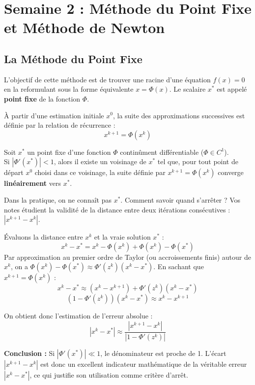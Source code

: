 \section{Semaine 2 : Méthode du Point Fixe et Méthode de Newton}

\subsection{La Méthode du Point Fixe}

L'objectif de cette méthode est de trouver une racine d'une équation $f(x) = 0$ en la reformulant sous la forme équivalente $x = \Phi(x)$. Le scalaire $x^*$ est appelé \textbf{point fixe} de la fonction $\Phi$.

\begin{definition}
À partir d'une estimation initiale $x^0$, la suite des approximations successives est définie par la relation de récurrence :
$$x^{k+1} = \Phi(x^k)$$
\end{definition}

\begin{theoreme}
Soit $x^*$ un point fixe d'une fonction $\Phi$ continûment différentiable ($\Phi \in C^1$). \\
Si $|\Phi'(x^*)| < 1$, alors il existe un voisinage de $x^*$ tel que, pour tout point de départ $x^0$ choisi dans ce voisinage, la suite définie par $x^{k+1} = \Phi(x^k)$ converge \textbf{linéairement} vers $x^*$.
\end{theoreme}

\begin{explication}
Dans la pratique, on ne connaît pas $x^*$. Comment savoir quand s'arrêter ? Vos notes étudient la validité de la distance entre deux itérations consécutives : $|x^{k+1} - x^k|$.

Évaluons la distance entre $x^k$ et la vraie solution $x^*$ :
$$x^k - x^* = x^k - \Phi(x^k) + \Phi(x^k) - \Phi(x^*)$$
Par approximation au premier ordre de Taylor (ou accroissements finis) autour de $x^k$, on a $\Phi(x^k) - \Phi(x^*) \approx \Phi'(z^k)(x^k - x^*)$. En sachant que $x^{k+1} = \Phi(x^k)$ :
$$x^k - x^* \approx (x^k - x^{k+1}) + \Phi'(z^k)(x^k - x^*)$$
$$(1 - \Phi'(z^k))(x^k - x^*) \approx x^k - x^{k+1}$$

On obtient donc l'estimation de l'erreur absolue :
$$|x^k - x^*| \approx \frac{|x^{k+1} - x^k|}{|1 - \Phi'(z^k)|}$$

\textbf{Conclusion :} Si $|\Phi'(x^*)| \ll 1$, le dénominateur est proche de 1. L'écart $|x^{k+1} - x^k|$ est donc un excellent indicateur mathématique de la véritable erreur $|x^k - x^*|$, ce qui justifie son utilisation comme critère d'arrêt.
\end{explication}

